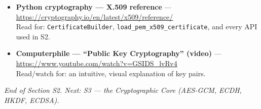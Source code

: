\documentclass[11pt,a4paper]{article}
\begin{document}
\begin{itemize}
        \url{https://cryptography.io/en/latest/x509/}\\
        Read for: how this project's exact library handles certificates and PEM.
  \item \textbf{Python cryptography --- X.509 reference} ---
        \url{https://cryptography.io/en/latest/x509/reference/}\\
        Read for: \texttt{CertificateBuilder}, \texttt{load\_pem\_x509\_certificate},
        and every API used in S2.
  \item \textbf{Computerphile --- ``Public Key Cryptography'' (video)} ---
        \url{https://www.youtube.com/watch?v=GSIDS_lvRv4}\\
        Read/watch for: an intuitive, visual explanation of key pairs.
\end{itemize}

\vfill
\begin{center}\footnotesize\itshape
End of Section S2. Next: S3 --- the Cryptographic Core (AES-GCM, ECDH, HKDF, ECDSA).
\end{center}
\end{document}
